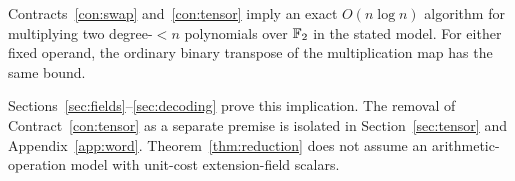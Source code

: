 \begin{theorem}\label{thm:reduction}
Contracts~\ref{con:swap} and~\ref{con:tensor} imply an exact
$O(n\log n)$ algorithm for multiplying two degree-$<n$ polynomials
over $\mathbb F_2$ in the stated model. For either fixed operand, the ordinary
binary transpose of the multiplication map has the same bound.
\end{theorem}
Sections~\ref{sec:fields}--\ref{sec:decoding} prove this implication.
The removal of Contract~\ref{con:tensor} as a separate premise
is isolated in Section~\ref{sec:tensor} and Appendix~\ref{app:word}.
Theorem~\ref{thm:reduction} does not assume an arithmetic-operation
model with unit-cost extension-field scalars.

